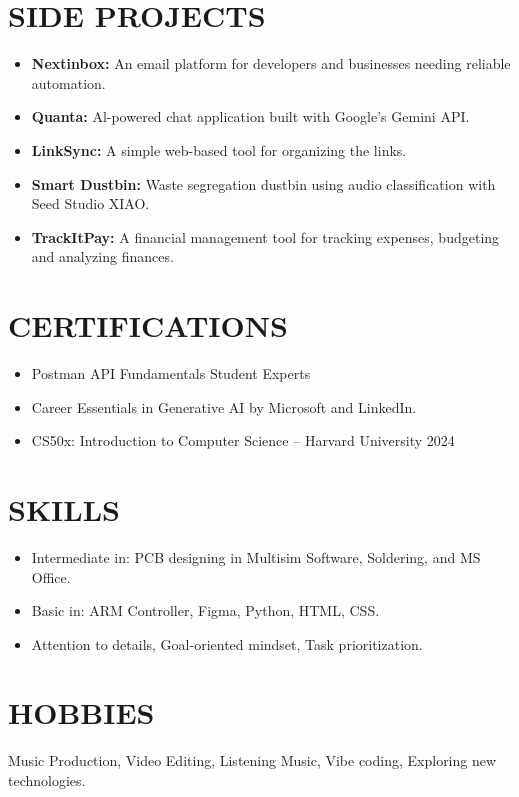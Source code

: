 \documentclass[10pt, a4paper]{article}
\newcommand{\bodyfont}{\fontsize{10pt}{12pt}\selectfont\setstretch{1.5}} %
\begin{document}
\section*{SIDE PROJECTS}

{\bodyfont
\begin{itemize}
    \item \textbf{Nextinbox:} An email platform for developers and businesses needing reliable automation.
    \item \textbf{Quanta:} Al-powered chat application built with Google's Gemini API.
    \item \textbf{LinkSync:} A simple web-based tool for organizing the links.
    \item \textbf{Smart Dustbin:} Waste segregation dustbin using audio classification with Seed Studio XIAO.
    \item \textbf{TrackItPay:} A financial management tool for tracking expenses, budgeting and analyzing finances.
\end{itemize}
}

\section*{CERTIFICATIONS}

{\bodyfont
\begin{itemize}
    \item Postman API Fundamentals Student Experts
    \item Career Essentials in Generative AI by Microsoft and LinkedIn.
    \item CS50x: Introduction to Computer Science – Harvard University 2024
\end{itemize}
}

\section*{SKILLS}

{\bodyfont
\begin{itemize}
    \item Intermediate in: PCB designing in Multisim Software, Soldering, and MS Office.
    \item Basic in: ARM Controller, Figma, Python, HTML, CSS.
    \item Attention to details, Goal-oriented mindset, Task prioritization.
\end{itemize}
}

\section*{HOBBIES}

{\bodyfont
\noindent Music Production, Video Editing, Listening Music, Vibe coding, Exploring new technologies.
}
\end{document}
